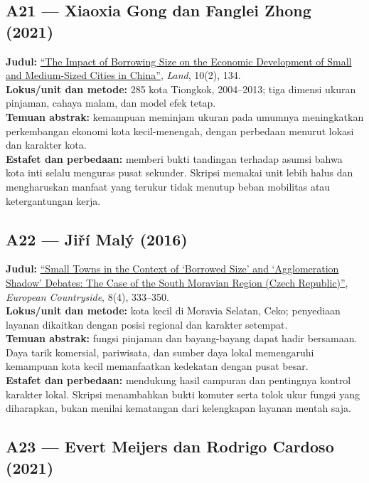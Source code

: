 \documentclass[
  indonesian,
  11pt,
  a4paper,
  oneside,
  openany]{report}
\begin{document}
\subsection{A21 --- Xiaoxia Gong dan Fanglei Zhong
(2021)}\label{a21-xiaoxia-gong-dan-fanglei-zhong-2021}

\textbf{Judul:} \href{https://doi.org/10.3390/land10020134}{``The Impact
of Borrowing Size on the Economic Development of Small and Medium-Sized
Cities in China''}, \emph{Land}, 10(2), 134.\\
\textbf{Lokus/unit dan metode:} 285 kota Tiongkok, 2004--2013; tiga
dimensi ukuran pinjaman, cahaya malam, dan model efek tetap.\\
\textbf{Temuan abstrak:} kemampuan meminjam ukuran pada umumnya
meningkatkan perkembangan ekonomi kota kecil-menengah, dengan perbedaan
menurut lokasi dan karakter kota.\\
\textbf{Estafet dan perbedaan:} memberi bukti tandingan terhadap asumsi
bahwa kota inti selalu menguras pusat sekunder. Skripsi memakai unit
lebih halus dan mengharuskan manfaat yang terukur tidak menutup beban
mobilitas atau ketergantungan kerja.

\subsection{A22 --- Jiří Malý
(2016)}\label{a22-jiux159uxed-maluxfd-2016}

\textbf{Judul:} \href{https://doi.org/10.1515/euco-2016-0024}{``Small
Towns in the Context of `Borrowed Size' and `Agglomeration Shadow'
Debates: The Case of the South Moravian Region (Czech Republic)''},
\emph{European Countryside}, 8(4), 333--350.\\
\textbf{Lokus/unit dan metode:} kota kecil di Moravia Selatan, Ceko;
penyediaan layanan dikaitkan dengan posisi regional dan karakter
setempat.\\
\textbf{Temuan abstrak:} fungsi pinjaman dan bayang-bayang dapat hadir
bersamaan. Daya tarik komersial, pariwisata, dan sumber daya lokal
memengaruhi kemampuan kota kecil memanfaatkan kedekatan dengan pusat
besar.\\
\textbf{Estafet dan perbedaan:} mendukung hasil campuran dan pentingnya
kontrol karakter lokal. Skripsi menambahkan bukti komuter serta tolok
ukur fungsi yang diharapkan, bukan menilai kematangan dari kelengkapan
layanan mentah saja.

\subsection{A23 --- Evert Meijers dan Rodrigo Cardoso
(2021)}\label{a23-evert-meijers-dan-rodrigo-cardoso-2021}
\end{document}
